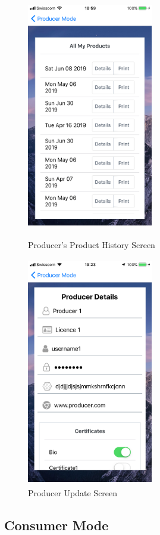 \begin{figure}[!h]
	\centering
	\begin{minipage}[t]{4cm}
		\centering
		\includegraphics[width=5.5cm, height=10cm]{figures/app-7.PNG}
		\caption{Producer's Product History Screen}
		\label{fig:app-producer-product-history-screen}
	\end{minipage}
	\hspace{3cm}
	\begin{minipage}[t]{4cm}
		\centering
		\includegraphics[width=5.5cm, height=10cm]{figures/app-8.PNG}
		\caption{Producer Update Screen}
		\label{fig:app-producer-update-screen}
	\end{minipage}
\end{figure}


\subsection{Consumer Mode}